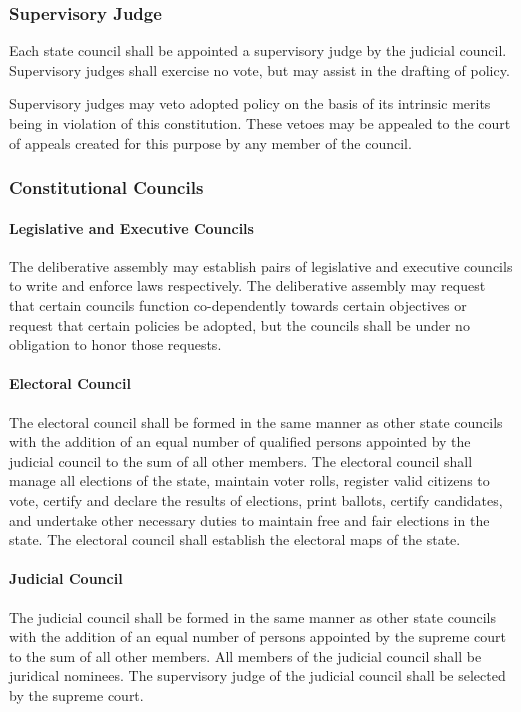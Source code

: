 \documentclass{article}
\begin{document}
\subsubsection{Supervisory Judge}
Each state council shall be appointed a supervisory judge by the judicial council. Supervisory judges shall exercise no vote, but may assist in the drafting of policy.

Supervisory judges may veto adopted policy on the basis of its intrinsic merits being in violation of this constitution. These vetoes may be appealed to the court of appeals created for this purpose by any member of the council.
\subsubsection{Constitutional Councils}
\paragraph{Legislative and Executive Councils}
The deliberative assembly may establish pairs of legislative and executive councils to write and enforce laws respectively. The deliberative assembly may request that certain councils function co-dependently towards certain objectives or request that certain policies be adopted, but the councils shall be under no obligation to honor those requests.
\paragraph{Electoral Council}
The electoral council shall be formed in the same manner as other state councils with the addition of an equal number of qualified persons appointed by the judicial council to the sum of all other members. The electoral council shall manage all elections of the state, maintain voter rolls, register valid citizens to vote, certify and declare the results of elections, print ballots, certify candidates, and undertake other necessary duties to maintain free and fair elections in the state. The electoral council shall establish the electoral maps of the state.
\paragraph{Judicial Council}
The judicial council shall be formed in the same manner as other state councils with the addition of an equal number of persons appointed by the supreme court to the sum of all other members. All members of the judicial council shall be juridical nominees. The supervisory judge of the judicial council shall be selected by the supreme court.
\end{document}
